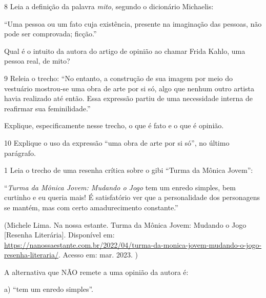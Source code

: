 \num{8} Leia a definição da palavra \emph{mito}, segundo o dicionário
Michaelis:

``Uma pessoa ou um fato cuja existência, presente na imaginação das
pessoas, não pode ser comprovada; ficção.''

Qual é o intuito da autora do artigo de opinião ao chamar Frida Kahlo,
uma pessoa real, de mito?



\num{9} Releia o trecho: ``No entanto, a construção de sua imagem por
meio do vestuário mostrou-se uma obra de arte por si só, algo que nenhum
outro artista havia realizado até então. Essa expressão partiu de uma
necessidade interna de reafirmar sua feminilidade.''

Explique, especificamente nesse trecho, o que é fato e o que é opinião.



\num{10} Explique o uso da expressão ``uma obra de arte por si só'', no
último parágrafo.




\num{1} Leia o trecho de uma resenha crítica sobre o gibi ``Turma da
Mônica Jovem'':

``\emph{Turma da Mônica Jovem: Mudando o Jogo} tem um enredo simples,
bem curtinho e eu queria mais! É satisfatório ver que a personalidade
dos personagens se mantém, mas com certo amadurecimento constante.''

(Michele Lima. Na nossa estante. Turma da Mônica Jovem: Mudando o Jogo
{[}Resenha Literária{]}. Disponível em: 
\url{https://nanossaestante.com.br/2022/04/turma-da-monica-jovem-mudando-o-jogo-resenha-literaria/}.
Acesso em: mar. 2023. )

A alternativa que NÃO remete a uma opinião da autora é:

a) ``tem um enredo simples''.

